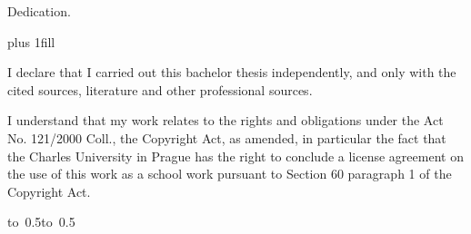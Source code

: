 \documentclass[12pt,a4paper]{report}
\let\openright=\clearpage
\begin{document}
\newpage



\openright

\noindent
Dedication.

\newpage


\vglue 0pt plus 1fill

\noindent
I declare that I carried out this bachelor thesis independently, and only with the cited
sources, literature and other professional sources.

\medskip\noindent
I understand that my work relates to the rights and obligations under the Act No.
121/2000 Coll., the Copyright Act, as amended, in particular the fact that the Charles
University in Prague has the right to conclude a license agreement on the use of this
work as a school work pursuant to Section 60 paragraph 1 of the Copyright Act.

\vspace{10mm}

\hbox{\hbox to 0.5\hbox to 0.5}

\vspace{20mm}
\newpage

\end{document}
